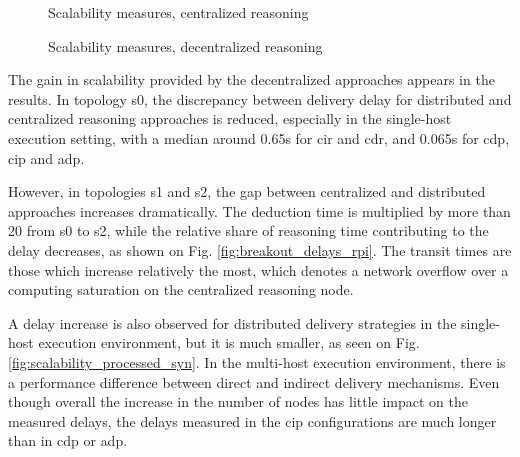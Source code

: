 \documentclass[sw]{iosart2x}
\begin{document}
\begin{figure}
	\caption{Scalability measures, centralized reasoning}
	\label{fig:factory_scala_processed}
	\Centering
	\label{fig:factory_scala_raw_rpi}
	\scalebox{1}{
		
	}
\end{figure}

\begin{figure}
	\caption{Scalability measures, decentralized reasoning}
	\vfill
	\noindent
	
	\begin{minipage}{0.33\textwidth}
		\Centering
		\label{fig:scalability_processed_rpi}
		\scalebox{0.9}{
			
		}
	\end{minipage}
	\begin{minipage}{0.33\textwidth}
		\Centering
		\label{fig:scalability_processed_rpi2}
		\scalebox{0.9}{
			
		}
	\end{minipage}
	\begin{minipage}{0.329\textwidth}
		\Centering
		\label{fig:factory_scala_cip_rpi2}
		\scalebox{0.9}{
			
		}
	\end{minipage}
\end{figure}

The gain in scalability provided by the decentralized approaches appears in the results. 
In topology s0, the discrepancy between delivery delay for distributed and centralized reasoning approaches is reduced, especially in the single-host execution setting, with a median around 0.65s for \gls{cir} and \gls{cdr}, and 0.065s for \gls{cdp}, \gls{cip} and \gls{adp}.

However, in topologies s1 and s2, the gap between centralized and distributed approaches increases dramatically. 
The deduction time is multiplied by more than 20 from s0 to s2, while the relative share of reasoning time contributing to the delay decreases, as shown on Fig. \ref{fig:breakout_delays_rpi}.
The transit times are those which increase relatively the most, which denotes a network overflow over a computing saturation on the centralized reasoning node.

A delay increase is also observed for distributed delivery strategies in the single-host execution environment, but it is much smaller, as seen on Fig. \ref{fig:scalability_processed_syn}.
In the multi-host execution environment, there is a performance difference between direct and indirect delivery mechanisms.
Even though overall the increase in the number of nodes has little impact on the measured delays, the delays measured in the \gls{cip} configurations are much longer than in \gls{cdp} or \gls{adp}. 
\end{document}
